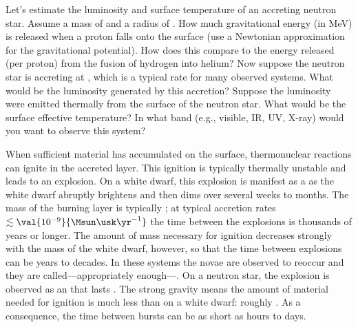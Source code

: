 \begin{exercisebox}
Let's estimate the luminosity and surface temperature of an accreting neutron star. Assume a mass of  and a radius of . How much gravitational energy (in MeV) is released when a proton falls onto the surface (use a Newtonian approximation for the gravitational potential). How does this compare to the energy released (per proton) from the fusion of hydrogen into helium? Now suppose the neutron star is accreting at , which is a typical rate for many observed systems. What would be the luminosity generated by this accretion? Suppose the luminosity were emitted thermally from the surface of the neutron star. What would be the surface effective temperature? In what band (e.g., visible, IR, UV, X-ray) would you want to observe this system?
\end{exercisebox}

When sufficient material has accumulated on the surface, thermonuclear reactions can ignite in the accreted layer. This ignition is typically thermally unstable and leads to an explosion. On a white dwarf, this explosion is manifest as a  as the white dwarf abruptly brightens and then dims over several weeks to months. The mass of the burning layer is typically ; at typical accretion rates $\lesssim\val{10^{-9}}{\Msun\usk\yr^{-1}}$ the time between the explosions is thousands of years or longer. The amount of mass necessary for ignition decreases strongly with the mass of the white dwarf, however, so that the time between explosions can be years to decades. In these systems the novae are observed to reoccur and they are called---appropriately enough---.
On a neutron star, the explosion is observed as an  that lasts . The strong gravity means the amount of material needed for ignition is much less than on a white dwarf: roughly . As a consequence, the time between bursts can be as short as hours to days. 

